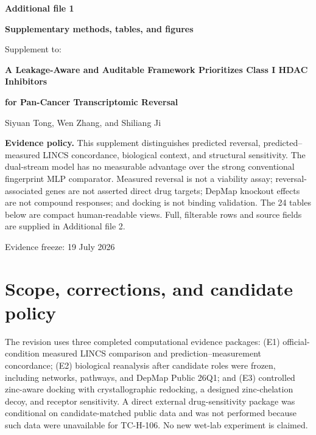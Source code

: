 \documentclass[10pt]{article}
\begin{document}
\begin{titlepage}
\centering
{\Large\bfseries Additional file 1\par}
\vspace{0.35cm}
{\LARGE\bfseries Supplementary methods, tables, and figures\par}
\vspace{0.8cm}
{\large Supplement to:\par}
\vspace{0.2cm}
{\Large\bfseries A Leakage-Aware and Auditable Framework Prioritizes Class I HDAC Inhibitors\par}
{\Large\bfseries for Pan-Cancer Transcriptomic Reversal\par}
\vspace{0.8cm}
{\large Siyuan Tong, Wen Zhang, and Shiliang Ji\par}
\vfill
\begin{minipage}{0.88\textwidth}
\small
\textbf{Evidence policy.} This supplement distinguishes predicted reversal, predicted--measured LINCS concordance, biological context, and structural sensitivity. The dual-stream model has no measurable advantage over the strong conventional fingerprint MLP comparator. Measured reversal is not a viability assay; reversal-associated genes are not asserted direct drug targets; DepMap knockout effects are not compound responses; and docking is not binding validation. The 24 tables below are compact human-readable views. Full, filterable rows and source fields are supplied in Additional file 2.
\end{minipage}
\vfill
{\large Evidence freeze: 19 July 2026\par}
\end{titlepage}

\tableofcontents
\clearpage

\section{Scope, corrections, and candidate policy}

The revision uses three completed computational evidence packages: (E1) official-condition measured LINCS comparison and prediction--measurement concordance; (E2) biological reanalysis after candidate roles were frozen, including networks, pathways, and DepMap Public 26Q1; and (E3) controlled zinc-aware docking with crystallographic redocking, a designed zinc-chelation decoy, and receptor sensitivity. A direct external drug-sensitivity package was conditional on candidate-matched public data and was not performed because such data were unavailable for TC-H-106. No new wet-lab experiment is claimed.
\end{document}
